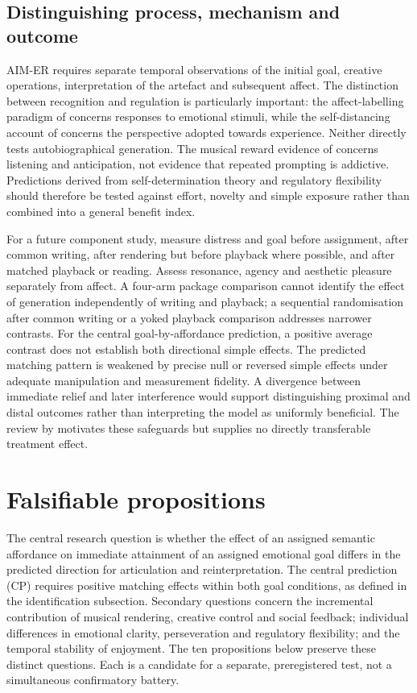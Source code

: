 \documentclass[11pt,a4paper]{article}
\begin{document}
\subsection{Distinguishing process, mechanism and outcome}
AIM-ER requires separate temporal observations of the initial goal, creative operations, interpretation of the artefact and subsequent affect. The distinction between recognition and regulation is particularly important: the affect-labelling paradigm of \citet{lieberman2007} concerns responses to emotional stimuli, while the self-distancing account of \citet{kross2011} concerns the perspective adopted towards experience. Neither directly tests autobiographical generation. The musical reward evidence of \citet{salimpoor2011} concerns listening and anticipation, not evidence that repeated prompting is addictive. Predictions derived from self-determination theory \citep{ryan2000} and regulatory flexibility \citep{bonanno2013} should therefore be tested against effort, novelty and simple exposure rather than combined into a general benefit index.

For a future component study, measure distress and goal before assignment, after common writing, after rendering but before playback where possible, and after matched playback or reading. Assess resonance, agency and aesthetic pleasure separately from affect. A four-arm package comparison cannot identify the effect of generation independently of writing and playback; a sequential randomisation after common writing or a yoked playback comparison addresses narrower contrasts. For the central goal-by-affordance prediction, a positive average contrast does not establish both directional simple effects. The predicted matching pattern is weakened by precise null or reversed simple effects under adequate manipulation and measurement fidelity. A divergence between immediate relief and later interference would support distinguishing proximal and distal outcomes rather than interpreting the model as uniformly beneficial. The review by \citet{jin2026} motivates these safeguards but supplies no directly transferable treatment effect.

\section{Falsifiable propositions}
The central research question is whether the effect of an assigned semantic affordance on immediate attainment of an assigned emotional goal differs in the predicted direction for articulation and reinterpretation. The central prediction (CP) requires positive matching effects within both goal conditions, as defined in the identification subsection. Secondary questions concern the incremental contribution of musical rendering, creative control and social feedback; individual differences in emotional clarity, perseveration and regulatory flexibility; and the temporal stability of enjoyment. The ten propositions below preserve these distinct questions. Each is a candidate for a separate, preregistered test, not a simultaneous confirmatory battery.
\end{document}
